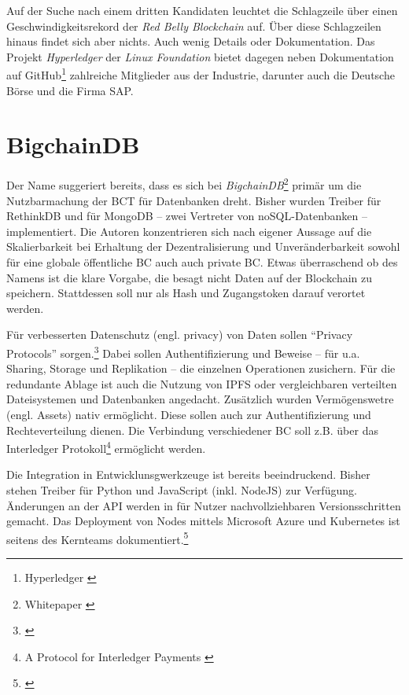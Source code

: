 Auf der Suche nach einem dritten Kandidaten leuchtet die Schlagzeile über einen Geschwindigkeitsrekord der \emph{Red Belly Blockchain} auf. Über diese Schlagzeilen hinaus findet sich aber nichts. Auch wenig Details oder Dokumentation. Das Projekt \emph{Hyperledger} der \emph{Linux Foundation} bietet dagegen neben Dokumentation auf GitHub\footnote{Hyperledger \cite{w:github-hyperledger}} zahlreiche Mitglieder aus der Industrie, darunter auch die Deutsche Börse und die Firma SAP.

\section{BigchainDB}

Der Name suggeriert bereits, dass es sich bei \emph{BigchainDB}\footnote{Whitepaper \autocite{p:bigchaindb}} primär um die Nutzbarmachung der \gls{BCT} für Datenbanken dreht.
Bisher wurden Treiber für RethinkDB und für MongoDB -- zwei Vertreter von noSQL-Datenbanken -- implementiert. Die Autoren konzentrieren sich nach eigener Aussage auf die Skalierbarkeit bei Erhaltung der Dezentralisierung und Unveränderbarkeit sowohl für eine globale öffentliche \gls{BC} auch auch private \gls{BC}.
Etwas überraschend ob des Namens ist die klare Vorgabe, die besagt nicht Daten auf der Blockchain zu speichern. Stattdessen soll nur als Hash und Zugangstoken darauf verortet werden.

Für verbesserten Datenschutz (engl. privacy) von Daten sollen \enquote{Privacy Protocols} sorgen.\footnote{\cite{w:github-bigchaindb-pp}}
Dabei sollen Authentifizierung und Beweise -- für u.a. Sharing, Storage und Replikation -- die einzelnen Operationen zusichern.
Für die redundante Ablage ist auch die Nutzung von \gls{IPFS} oder vergleichbaren verteilten Dateisystemen und Datenbanken angedacht.
Zusätzlich wurden Vermögenswetre (engl. Assets) nativ ermöglicht.
Diese sollen auch zur Authentifizierung und Rechteverteilung dienen.
Die Verbindung verschiedener \gls{BC} soll z.B. über das Interledger Protokoll\footnote{A Protocol for Interledger Payments \autocite{p:interledger}}\label{first:interledger} ermöglicht werden.

Die Integration in Entwicklunsgwerkzeuge ist bereits beeindruckend.
Bisher stehen Treiber für Python und JavaScript (inkl. NodeJS) zur Verfügung.
Änderungen an der API werden in für Nutzer nachvollziehbaren Versionsschritten gemacht.
Das Deployment von Nodes mittels Microsoft Azure und Kubernetes ist seitens des Kernteams dokumentiert.\footnote{\cite{w:bigchaindb-proddepl}}

